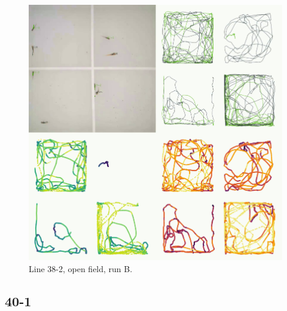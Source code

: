 \documentclass[
]{book}
\begin{document}
\begin{figure}
\includegraphics[width=1\linewidth]{figs/mikk_behaviour/four_panel_plots/open_field_20191116_1309_21-2_R_B_300} \caption{Line 38-2, open field, run B.}\label{fig:4p-21-2-of-B}
\end{figure}

\hypertarget{section-5}{%
\subsection{40-1}\label{section-5}}
\end{document}

